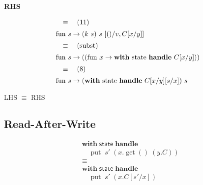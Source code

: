 \documentclass[logo,bsc,singlespacing,parskip]{infthesis}
\begin{document}
\textbf{RHS}

\[ 
\begin{array}{l}
\quad\equiv\quad (11) \\[5pt]
\text{fun } s \rightarrow (k\ s)\ s\ [()/v, C[x/y]] \\[5pt]
\quad\equiv\quad (\text{subst}) \\[5pt]
\text{fun } s \rightarrow ((\text{fun } x \rightarrow \text{\textbf{with} state \textbf{handle} } C[x/y])) \\[5pt]
\quad\equiv\quad (8) \\[5pt]
\text{fun } s \rightarrow (\text{\textbf{with} state \textbf{handle} } C[x/y][s/x])\ s
\end{array}
\]

LHS $\equiv$ RHS



\subsection*{Read-After-Write}

\[
\begin{aligned}
    &\mathsf{\textbf{with}} \; \mathsf{state} \; \mathsf{\textbf{handle}} \\
    &\quad \operatorname{put} \; s' \; (x. \operatorname{get}() \; (y. C)) \\
    &\equiv \\
    &\mathsf{\textbf{with}} \; \mathsf{state} \; \mathsf{\textbf{handle}} \\
    &\quad \operatorname{put} \; s' \; (x. C[s'/x])
\end{aligned}
\]
\end{document}
